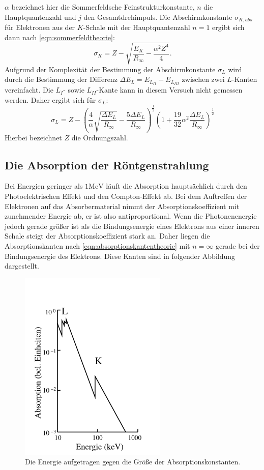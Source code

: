 $\alpha$ bezeichnet hier die Sommerfeldsche Feinstrukturkonstante, $n$ die
Hauptquantenzahl und $j$ den Gesamtdrehimpuls.
Die Abschirmkonstante $\sigma_{K, abs}$ für Elektronen aus der $K$-Schale mit
der Hauptquantenzahl $n = 1$ ergibt sich dann nach \eqref{eqn:sommerfeldtheorie}:
\begin{equation}
  \sigma_K = Z - \sqrt{\frac{E_K}{R_\infty} - \frac{\alpha^2 Z^4}{4}}.
  \label{abschirmktheorie}
\end{equation}
Aufgrund der Komplexität der Bestimmung der Abschirmkonstante $\sigma_L$ wird durch
die Bestimmung der Differenz $\Delta E_L = E_{L_{II}} - E_{L_{III}}$ zwischen
zwei $L$-Kanten vereinfacht. Die $L_{I}$- sowie $L_{II}$-Kante kann in diesem
Versuch nicht gemessen werden. Daher ergibt sich für $\sigma_L$:
\begin{equation}
  \sigma_L = Z - \left( \frac{4}{\alpha} \sqrt{\frac{\Delta E_L}{R_{\infty}}} - \frac{5 \Delta E_L}{R_{\infty}} \right)^{\frac{1}{2}} \left( 1 + \frac{19}{32} \alpha^2 \frac{\Delta E_L}{R_{\infty}} \right)^{\frac{1}{2}}
  \label{eqn:sigmaktheorie}
\end{equation}
Hierbei bezeichnet $Z$ die Ordnungszahl.


\subsection{Die Absorption der Röntgenstrahlung}
Bei Energien geringer als $1 \si{\mega\electronvolt}$ läuft die Absorption
hauptsächlich durch den Photoelektrischen Effekt und den Compton-Effekt ab.
Bei dem Auftreffen der Elektronen auf das Absorbermaterial nimmt der
Absorptionskoeffizient mit zunehmender Energie ab, er ist also antiproportional.
Wenn die Photonenenergie jedoch gerade größer ist als die Bindungsenergie eines
Elektrons aus einer inneren Schale steigt der Absorptionskoeffizient stark an.
Daher liegen die Absorptionskanten nach \eqref{eqn:absorptionskantentheorie} mit
$n = \infty$ gerade bei der Bindungsenergie des Elektrons. Diese Kanten sind in
folgender Abbildung dargestellt.
\begin{figure}[H]
  \centering
  \includegraphics[scale=0.5]{"content/absorptionskanten.png"}
  \caption{Die Energie aufgetragen gegen die Größe der Absorptionskonstanten.}
  \label{fig:absorptionskanten}
\end{figure}
\noindent

